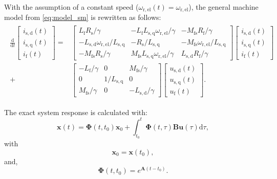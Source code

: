 \begin{solutionblock}
    With the assumption of a constant speed ($\omega_{\mathrm{r,el}}(t) =\omega_{\mathrm{r,el}}$), the general machine model from \eqref{eq:model_sm} is rewritten as follows:
    \begin{align}
        \begin{split}
        \frac{\mathrm{d}}{\mathrm{d}t}
        \begin{bmatrix}
            i_{\mathrm{s,d}}(t) \\
            i_{\mathrm{s,q}}(t) \\
            i_{\mathrm{f}}(t)
        \end{bmatrix}
        = &
        \begin{bmatrix}
            L_{\mathrm{f}}R_{\mathrm{s}}/\gamma     & -L_{\mathrm{f}}L_{\mathrm{s,q}}\omega_{\mathrm{r,el}}/\gamma & -M_{\mathrm{fs}}R_{\mathrm{f}}/\gamma \\
            -L_{\mathrm{s,d}}\omega_{\mathrm{r,el}}/L_{\mathrm{s,q}} & -R_{\mathrm{s}}/L_{\mathrm{s,q}} & -M_{\mathrm{fs}}\omega_{\mathrm{r,el}}/L_{\mathrm{s,q}} \\
            -M_{\mathrm{fs}}R_{\mathrm{s}}/\gamma & M_{\mathrm{fs}}L_{\mathrm{s,q}}\omega_{\mathrm{r,el}} / \gamma & L_{\mathrm{s,d}}R_{\mathrm{f}}/\gamma 
        \end{bmatrix}
        \begin{bmatrix}
            i_{\mathrm{s,d}}(t) \\
            i_{\mathrm{s,q}}(t) \\
            i_{\mathrm{f}}(t)
        \end{bmatrix}
        \\
        + &
        \begin{bmatrix}
            -L_{\mathrm{f}}/\gamma & 0 & M_{\mathrm{fs}}/\gamma \\
            0 & 1/L_{\mathrm{s,q}} & 0 \\
            M_{\mathrm{fs}}/\gamma & 0 & -L_{\mathrm{s,d}}/\gamma
        \end{bmatrix}
        \begin{bmatrix}
            u_{\mathrm{s,d}}(t) \\
            u_{\mathrm{s,q}}(t) \\
            u_{\mathrm{f}}(t)
        \end{bmatrix}.
    \end{split}
    \end{align}
    
    The exact system response is calculated with:
    \begin{equation}
        \bm{x}(t) = \bm{\Phi}(t,t_{\mathrm{0}})\bm{x}_{\mathrm{0}} + \int_{t_{\mathrm{0}}}^{t}\bm{\Phi}(t,\tau)\bm{B}\bm{u}(\tau) \mathrm{d}\tau,
    \end{equation}
    with
    \begin{equation}
        \bm{x}_{\mathrm{0}} = \bm{x}(t_{\mathrm{0}}),
    \end{equation}
    and,
    \begin{equation}
        \bm{\Phi}(t,t_{\mathrm{0}}) = e^{\bm{A}(t-t_{\mathrm{0}})}.
    \end{equation}
    


\end{solutionblock}
